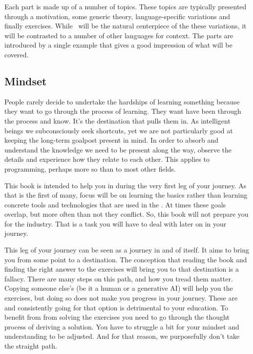 Each part is made up of a number of topics. These topics are typically presented through a motivation, some generic theory, language-specific variations and finally exercises. While \csharp\ will be the natural centerpiece of the these variations, it will be contrasted to a number of other languages for context. The parts are introduced by a single example that gives a good impression of what will be covered.

\subsection{Mindset}

\begin{inspiration}{\cite{selfrel}}
\end{inspiration}

People rarely decide to undertake the hardships of learning something because they want to go through the process of learning. They want have been through the process and know. It's the destination that pulls them in. As intelligent beings we subconsciously seek shortcuts, yet we are not particularly good at keeping the long-term goalpost present in mind. In order to absorb and understand the knowledge we need to be present along the way, observe the details and experience how they relate to each other. This applies to programming, perhaps more so than to most other fields.

This book is intended to help you in during the very first leg of your journey. As that is the first of many, focus will be on learning the basics rather than learning concrete tools and technologies that are used in the . At times these goals overlap, but more often than not they conflict. So, this book will not prepare you for the industry. That is a task you will have to deal with later on in your journey.

This leg of your journey can be seen as a journey in and of itself. It aims to bring you from some point to a destination. The conception that reading the book and finding the right answer to the exercises will bring you to that destination is a fallacy. There are many steps on this path, and how you tread them matter.
Copying someone else's  (be it a human or a generative AI) will help you  the exercises, but doing so does not make you progress in your journey. These are  and consistently going for that option is detrimental to your education. To benefit from from solving the exercises you need to go through the thought process of deriving a solution. You have to struggle a bit for your mindset and understanding to be adjusted. And for that reason, we purposefully don't take the straight path.

